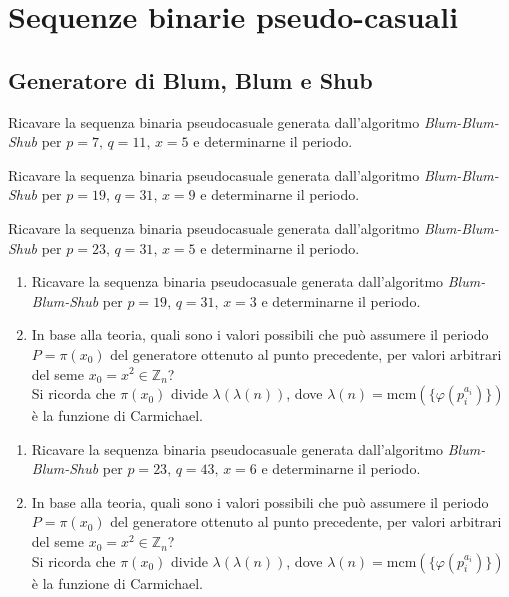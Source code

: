 
\chapter{Sequenze binarie pseudo-casuali}

    \bigskip
    \section{Generatore di Blum, Blum e Shub}
        Ricavare la sequenza binaria pseudo\nbdash casuale generata dall'algoritmo \emph{Blum-Blum-Shub} 
        per $p=7,\, q=11,\, x=5$ e determinarne il periodo.

        Ricavare la sequenza binaria pseudo\nbdash casuale generata dall'algoritmo \emph{Blum-Blum-Shub} 
        per $p=19,\, q=31,\, x=9$ e determinarne il periodo.

        Ricavare la sequenza binaria pseudo\nbdash casuale generata dall'algoritmo \emph{Blum-Blum-Shub} 
        per $p=23,\, q=31,\, x=5$ e determinarne il periodo.

        \begin{enumerate}
            \item Ricavare la sequenza binaria pseudo\nbdash casuale generata dall'algoritmo \emph{Blum-Blum-Shub} 
                per $p=19,\, q=31,\, x=3$ e determinarne il periodo.
            \item In base alla teoria, quali sono i valori possibili che può assumere il periodo $P = \pi(x_0)$ del 
                generatore ottenuto al punto precedente, per valori arbitrari del seme $x_0 =x^2 \in\mathbb{Z}_n$?\\
                Si ricorda che $\pi(x_0)$ divide $\lambda(\lambda(n))$, dove 
                $\lambda(n)=\mathrm{mcm}\left(\{\varphi(p^{a_i}_i)\}\right)$ è la funzione di Carmichael.
        \end{enumerate}

        \begin{enumerate}
            \item Ricavare la sequenza binaria pseudo\nbdash casuale generata dall'algoritmo \emph{Blum-Blum-Shub} 
                per $p=23,\, q=43,\, x=6$ e determinarne il periodo.
            \item In base alla teoria, quali sono i valori possibili che può assumere il periodo $P = \pi(x_0)$ del 
                generatore ottenuto al punto precedente, per valori arbitrari del seme $x_0 =x^2 \in\mathbb{Z}_n$?\\
                Si ricorda che $\pi(x_0)$ divide $\lambda(\lambda(n))$, dove 
                $\lambda(n)=\mathrm{mcm}\left(\{\varphi(p^{a_i}_i)\}\right)$ è la funzione di Carmichael.
        \end{enumerate}


